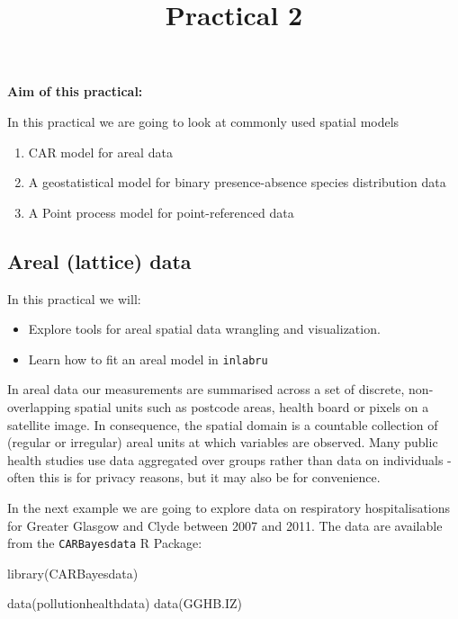\documentclass[
  letterpaper,
  DIV=11,
  numbers=noendperiod]{scrartcl}
\title{Practical 2}
\author{}
\date{}
\makeatletter
\newenvironment{Shaded}{\begin{snugshade}}{\end{snugshade}}
\newcommand{\FunctionTok}[1]{\textcolor[rgb]{0.28,0.35,0.67}{#1}}
\newcommand{\NormalTok}[1]{\textcolor[rgb]{0.00,0.23,0.31}{#1}}
\renewcommand{\maketitle}{\bgroup\setlength{\parindent}{0pt}
\begin{flushleft}
  {\sffamily\huge\textbf{\MakeUppercase{\@title}}} \vspace{0.3cm} \newline
  {\Large {\@subtitle}} \newline
  \@author
\end{flushleft}\egroup
}
\makeatother
\begin{document}
\maketitle

\pagestyle{mystyle}


\textbf{Aim of this practical:}

In this practical we are going to look at commonly used spatial models

\begin{enumerate}
\def\labelenumi{\arabic{enumi}.}
\item
  CAR model for areal data
\item
  A geostatistical model for binary presence-absence species
  distribution data
\item
  A Point process model for point-referenced data
\end{enumerate}

\subsection{Areal (lattice) data}\label{sec-areal_data}

In this practical we will:

\begin{itemize}
\item
  Explore tools for areal spatial data wrangling and visualization.
\item
  Learn how to fit an areal model in \texttt{inlabru}
\end{itemize}

In areal data our measurements are summarised across a set of discrete,
non-overlapping spatial units such as postcode areas, health board or
pixels on a satellite image. In consequence, the spatial domain is a
countable collection of (regular or irregular) areal units at which
variables are observed. Many public health studies use data aggregated
over groups rather than data on individuals - often this is for privacy
reasons, but it may also be for convenience.

In the next example we are going to explore data on respiratory
hospitalisations for Greater Glasgow and Clyde between 2007 and 2011.
The data are available from the \texttt{CARBayesdata} R Package:

\begin{Shaded}
\begin{Highlighting}[]
\FunctionTok{library}\NormalTok{(CARBayesdata)}

\FunctionTok{data}\NormalTok{(pollutionhealthdata)}
\FunctionTok{data}\NormalTok{(GGHB.IZ)}
\end{Highlighting}
\end{Shaded}
\end{document}

